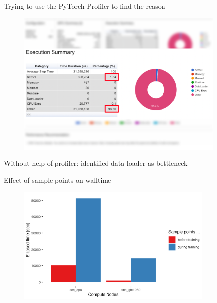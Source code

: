 \documentclass[compress,aspectratio=169]{beamer}
\begin{document}
\begin{frame}{Trying to use the PyTorch Profiler to find the reason}
    \vspace{-1em}
    \begin{center}
    \begin{figure}
        \includegraphics[width=0.9\textwidth]{../../data/scap_gtx1080_profiler-torch_sample-points_14650750_execution-time}
    \end{figure}
    \end{center}
\end{frame}

\begin{frame}{Without help of profiler: identified data loader as bottleneck}
    
\end{frame}

\begin{frame}{Effect of sample points on walltime}
    \vspace{-1em}
    \begin{center}
    \begin{figure}
        \includegraphics[width=0.85\textwidth]{../../data/sacct_barplot_by_nodes_sample-points-effect}
    \end{figure}
    \end{center}
\end{frame}
\end{document}
